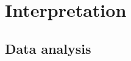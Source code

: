 
\chapter{Interpretation}
\label{chp:interpretation}

\section{Data analysis}
\label{sec:analysis}

